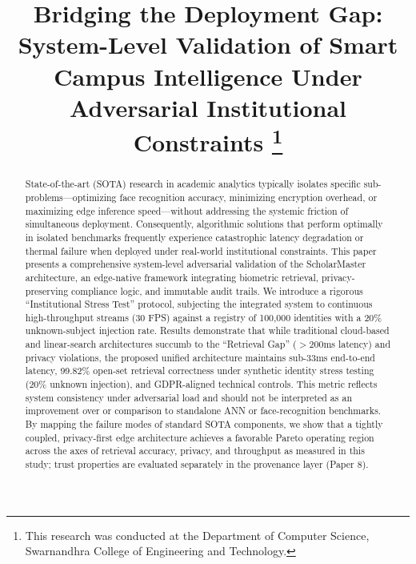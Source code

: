 \documentclass[conference]{IEEEtran}
\begin{document}
\title{Bridging the Deployment Gap: System-Level Validation of Smart Campus Intelligence Under Adversarial Institutional Constraints
\thanks{This research was conducted at the Department of Computer Science, Swarnandhra College of Engineering and Technology.}
}

\author{
}

\maketitle

\begin{abstract}
State-of-the-art (SOTA) research in academic analytics typically isolates specific sub-problems---optimizing face recognition accuracy, minimizing encryption overhead, or maximizing edge inference speed---without addressing the systemic friction of simultaneous deployment. Consequently, algorithmic solutions that perform optimally in isolated benchmarks frequently experience catastrophic latency degradation or thermal failure when deployed under real-world institutional constraints. This paper presents a comprehensive system-level adversarial validation of the ScholarMaster architecture, an edge-native framework integrating biometric retrieval, privacy-preserving compliance logic, and immutable audit trails. We introduce a rigorous ``Institutional Stress Test'' protocol, subjecting the integrated system to continuous high-throughput streams (30 FPS) against a registry of 100,000 identities with a 20\% unknown-subject injection rate. Results demonstrate that while traditional cloud-based and linear-search architectures succumb to the ``Retrieval Gap'' ($>200$ms latency) and privacy violations, the proposed unified architecture maintains sub-33ms end-to-end latency, 99.82\% open-set retrieval correctness under synthetic identity stress testing (20\% unknown injection), and GDPR-aligned technical controls. This metric reflects system consistency under adversarial load and should not be interpreted as an improvement over or comparison to standalone ANN or face-recognition benchmarks. By mapping the failure modes of standard SOTA components, we show that a tightly coupled, privacy-first edge architecture achieves a favorable Pareto operating region across the axes of retrieval accuracy, privacy, and throughput as measured in this study; trust properties are evaluated separately in the provenance layer (Paper 8).
\end{abstract}
\end{document}
